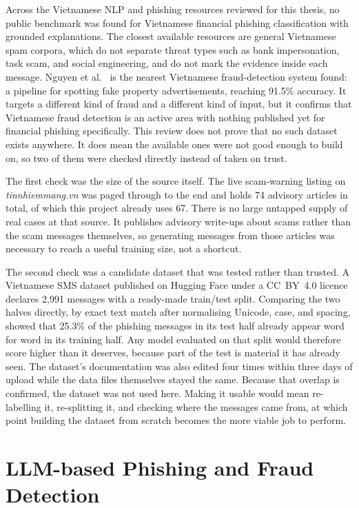 Across the Vietnamese NLP and phishing resources reviewed for this thesis, no public benchmark was found for Vietnamese financial phishing classification with grounded explanations. The closest available resources are general Vietnamese spam corpora, which do not separate threat types such as bank impersonation, task scam, and social engineering, and do not mark the evidence inside each message. Nguyen et al.~\cite{nguyen2025fakeads} is the nearest Vietnamese fraud-detection system found: a pipeline for spotting fake property advertisements, reaching 91.5\% accuracy. It targets a different kind of fraud and a different kind of input, but it confirms that Vietnamese fraud detection is an active area with nothing published yet for financial phishing specifically. This review does not prove that no such dataset exists anywhere. It does mean the available ones were not good enough to build on, so two of them were checked directly instead of taken on trust.

The first check was the size of the source itself. The live scam-warning listing on \textit{tinnhiemmang.vn} was paged through to the end and holds 74 advisory articles in total, of which this project already uses 67. There is no large untapped supply of real cases at that source. It publishes advisory write-ups about scams rather than the scam messages themselves, so generating messages from those articles was necessary to reach a useful training size, not a shortcut.

The second check was a candidate dataset that was tested rather than trusted. A Vietnamese SMS dataset published on Hugging Face under a CC~BY~4.0 licence~\cite{trannguyen2026vnsms} declares 2{,}991 messages with a ready-made train/test split. Comparing the two halves directly, by exact text match after normalising Unicode, case, and spacing, showed that 25.3\% of the phishing messages in its test half already appear word for word in its training half. Any model evaluated on that split would therefore score higher than it deserves, because part of the test is material it has already seen. The dataset's documentation was also edited four times within three days of upload while the data files themselves stayed the same. Because that overlap is confirmed, the dataset was not used here. Making it usable would mean re-labelling it, re-splitting it, and checking where the messages came from, at which point building the dataset from scratch becomes the more viable job to perform.

\section{LLM-based Phishing and Fraud Detection}

